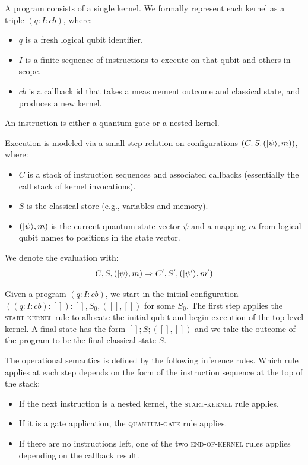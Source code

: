 A program consists of a single kernel. We formally represent each kernel as a triple $(q : I : cb)$, where:
\begin{itemize}
    \item $q$ is a fresh logical qubit identifier.
    \item $I$ is a finite sequence of instructions to execute on that qubit and others in scope.
    \item $cb$ is a callback id that takes a measurement outcome and classical state, and produces a new kernel.
\end{itemize}

An instruction is either a quantum gate or a nested kernel.

Execution is modeled via a small-step relation on configurations $(C, S, (|\psi\rangle, m))$, where:
\begin{itemize}
    \item $C$ is a stack of instruction sequences and associated callbacks (essentially the call stack of kernel invocations).
    \item $S$ is the classical store (e.g., variables and memory).
    \item $(|\psi\rangle, m)$ is the current quantum state vector $\psi$ and a mapping $m$ from logical qubit names to positions in the state vector.
\end{itemize}

We denote the evaluation with:
$$
C, S, (|\psi\rangle, m) \Rightarrow C', S', (|\psi'\rangle, m')
$$

Given a program $(q : I : cb)$, we start in the initial configuration $((q : I : cb):[]):[], S_0, ([], [])$ for some $S_0$. The first step applies the \textsc{start-kernel} rule to allocate the initial qubit and begin execution of the top-level kernel. A final state has the form $[]; S; ([], [])$ and we take the outcome of the program to be the final classical state $S$.

The operational semantics is defined by the following inference rules. Which rule applies at each step depends on the form of the instruction sequence at the top of the stack:
\begin{itemize}
\item If the next instruction is a nested kernel, the \textsc{start-kernel} rule applies.
\item If it is a gate application, the \textsc{quantum-gate} rule applies.
\item If there are no instructions left, one of the two \textsc{end-of-kernel} rules applies depending on the callback result.
\end{itemize}

